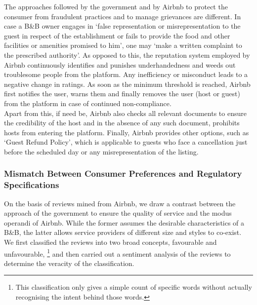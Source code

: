 \documentclass[a4paper, 12pt]{article}
\begin{document}
The approaches followed by the government and by Airbnb to protect the consumer from fraudulent practices and to manage grievances are different. In case a B\&B owner engages in ‘false representation or misrepresentation to the guest in respect of the establishment or fails to provide the food and other facilities or amenities promised to him’, one may ‘make a written complaint to the prescribed authority’. As opposed to this, the reputation system employed by Airbnb continuously identifies and punishes underhandedness and weeds out troublesome people from the platform. Any inefficiency or misconduct leads to a negative change in ratings. As soon as the minimum threshold is reached, Airbnb first notifies the user, warns them and finally removes the user (host or guest) from the platform in case of continued non-compliance. \\

Apart from this, if need be, Airbnb also checks all relevant documents to ensure the credibility of the host and in the absence of any such document, prohibits hosts from entering the platform. Finally, Airbnb provides other options, such as ‘Guest Refund Policy’, which is applicable to guests who face a cancellation just before the scheduled day or any misrepresentation of the listing.




\subsubsection{Mismatch Between Consumer Preferences and Regulatory Specifications}
On the basis of reviews mined from Airbnb, we draw a contrast between the approach of the government to ensure the quality of service and the modus operandi of Airbnb. While the former assumes the desirable characteristics of a B\&B, the latter allows service providers of different size and styles to co-exist. \\

We first classified the reviews into two broad concepts, favourable and unfavourable, \footnote{This classification only gives a simple count of specific words without actually recognising the intent behind those words.} and then carried out a sentiment analysis of the reviews to determine the veracity of the classification. \\
\end{document}
